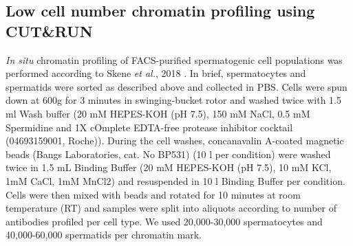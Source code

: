 \subsection{Low cell number chromatin profiling using CUT\&{}RUN}
\label{appA.2.CnR}

\emph{In situ} chromatin profiling of FACS-purified spermatogenic cell populations was performed according to Skene \emph{et al.}, 2018 \citep{Skene2018}. In brief, spermatocytes and spermatids were sorted as described above and collected in PBS. Cells were spun down at 600g for 3 minutes in swinging-bucket rotor and washed twice with 1.5 ml Wash buffer (20 mM HEPES-KOH (pH 7.5), 150 mM NaCl, 0.5 mM Spermidine and 1X cOmplete\texttrademark{} EDTA-free protease inhibitor cocktail (04693159001, Roche)). During the cell washes, concanavalin A-coated magnetic beads (Bangs Laboratories, cat. No BP531) (10 \textmu{}l per condition) were washed twice in 1.5 mL Binding Buffer (20 mM HEPES-KOH (pH 7.5), 10 mM KCl, 1mM CaCl, 1mM MnCl2) and resuspended in 10 \textmu{}l Binding Buffer per condition. Cells were then mixed with beads and rotated for 10 minutes at room temperature (RT) and samples were split into aliquots according to number of antibodies profiled per cell type. We used 20,000-30,000 spermatocytes and 40,000-60,000 spermatids per chromatin mark.\\ 

